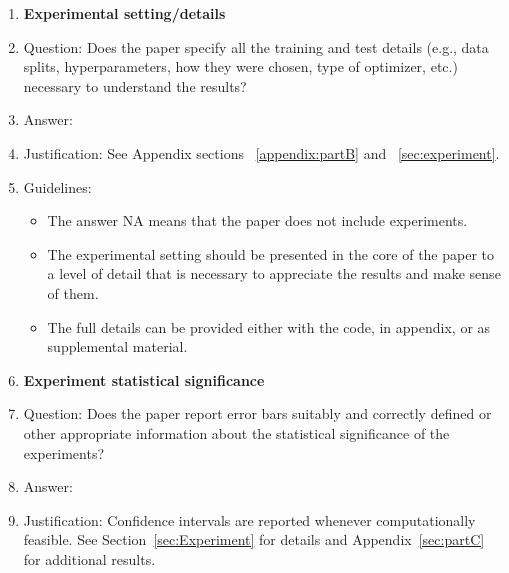 \documentclass{article}
\begin{document}
\begin{enumerate}
\item {\bf Experimental setting/details}
    \item[] Question: Does the paper specify all the training and test details (e.g., data splits, hyperparameters, how they were chosen, type of optimizer, etc.) necessary to understand the results?
    \item[] Answer: \answerYes{} %
    \item[] Justification: See Appendix sections ~\ref{appendix:partB} and ~\ref{sec:experiment}. 
    \item[] Guidelines:
    \begin{itemize}
        \item The answer NA means that the paper does not include experiments.
        \item The experimental setting should be presented in the core of the paper to a level of detail that is necessary to appreciate the results and make sense of them.
        \item The full details can be provided either with the code, in appendix, or as supplemental material.
    \end{itemize}

\item {\bf Experiment statistical significance}
    \item[] Question: Does the paper report error bars suitably and correctly defined or other appropriate information about the statistical significance of the experiments?
    \item[] Answer: \answerYes{} %
    \item[] Justification: Confidence intervals are reported whenever computationally feasible. See Section~\ref{sec:Experiment} for details and Appendix~\ref{sec:partC} for additional results.


\end{enumerate}
\end{document}
